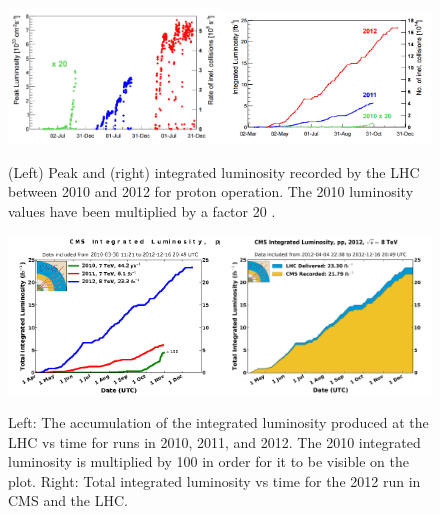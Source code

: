 \newpage

\begin{figure} 
\includegraphics[width=0.5\textwidth]{Figures/LHClumi2.png}\includegraphics[width=0.5\textwidth]{Figures/LHClumi.png}
\caption{(Left) Peak and (right) integrated luminosity recorded by the LHC between 2010 and 2012 for proton operation. The 2010 luminosity values have been multiplied by a factor 20 \cite{LHClumi}.}
\label{fig-LHClumi}
\end{figure}

\begin{figure} 
\includegraphics[width=0.5\textwidth]{Figures/IntLumi2.png}\includegraphics[width=0.5\textwidth]{Figures/CMSIntLumi.png}
\caption{Left: The accumulation of the integrated luminosity produced at the LHC vs time for runs in 2010, 2011, and 2012. The 2010 integrated luminosity is multiplied by 100 in order for it to be visible on the plot. Right: Total integrated luminosity vs time for the 2012 run in CMS and the LHC.}
\label{fig-CMSlumi}
\end{figure}


